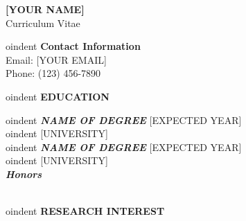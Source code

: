 \documentclass[12pt]{article}
\begin{document}

\begin{center}
	{\Large \bfseries [YOUR NAME]} \\ 
	{\large Curriculum Vitae} 	
\end{center}

	{
oindent \bf Contact Information} \\ 
	Email: [YOUR EMAIL] \\ 
	Phone: (123) 456-7890 \\ 


\begin{center} %
	{
oindent \bfseries EDUCATION}
\end{center} %

\vspace{8pt} %


oindent
{\sl \bfseries NAME OF DEGREE} \hfill [EXPECTED YEAR] \\ 

oindent [UNIVERSITY] \\


oindent
{\sl \bfseries NAME OF DEGREE} \hfill [EXPECTED YEAR] \\ 

oindent [UNIVERSITY] \\ 
{\setlength{\parindent}{1.1in} 
	{\indent \sl \bfseries Honors} \\ 
	 \\ 
	}
 
\vspace{0.2in} %


\begin{center}
	{
oindent \bfseries RESEARCH INTEREST}
\end{center}

\vspace{8pt} %
\setlength{\parindent}{0.5in}

 \\

\vspace{0.2in} %
\end{document}
